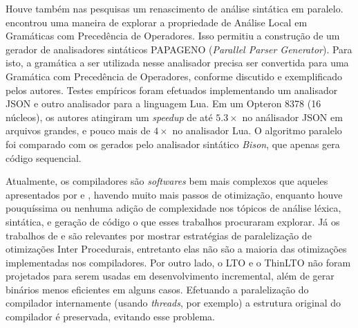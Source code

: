 Houve também nas pesquisas um renascimento de análise sintática em paralelo.
\cite{Barenghi:2015:PPM:2839536.2840146} encontrou uma maneira de explorar
a propriedade de Análise Local em Gramáticas com Precedência de Operadores.
Isso permitiu a construção de um gerador de analisadores sintáticos
PAPAGENO (\textit{Parallel Parser Generator}). Para isto, a gramática a
ser utilizada nesse analisador precisa ser convertida para uma Gramática
com Precedência de Operadores, conforme discutido e exemplificado pelos
autores. Testes empíricos foram efetuados implementando um analisador
JSON e outro analisador para a linguagem Lua. Em um Opteron 8378 (16 núcleos),
os autores atingiram um \textit{speedup} de até $5.3\times$ no análisador JSON
em arquivos grandes, e pouco mais de $4\times$ no analisador Lua. O algoritmo
paralelo foi comparado com os gerados pelo analisador sintático \textit{Bison},
que apenas gera código sequencial.

Atualmente, os compiladores são \textit{softwares} bem mais complexos que
aqueles apresentados por \cite{vandevoorde1988workcrews} e \cite{wortman1992},
havendo muito mais passos de otimização, enquanto houve pouquíssima ou nenhuma
adição de complexidade nos tópicos de análise léxica, sintática, e geração de
código o que esses trabalhos procuraram explorar. Já os trabalhos de
\cite{Lee1994} e \cite{kramer1994combining} são relevantes por mostrar
estratégias de paralelização de otimizações Inter Procedurais, entretanto elas
não são a maioria das otimizações implementadas nos compiladores. Por outro
lado, o LTO e o ThinLTO não foram projetados para serem usadas em
desenvolvimento incremental, além de gerar binários menos eficientes em alguns
casos. Efetuando a paralelização do compilador internamente (usando
\textit{threads}, por exemplo) a estrutura original do compilador é preservada,
evitando esse problema.
